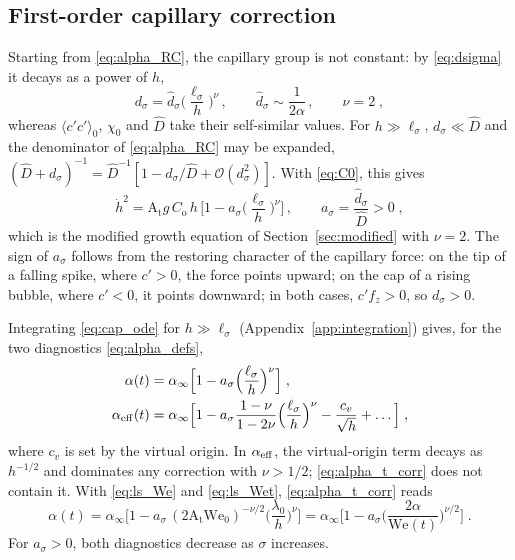 \documentclass[11pt]{article}
\numberwithin{equation}{section}
\newcommand{\avg}[1]{\langle #1\rangle}
\newcommand{\At}{\mathrm{A_t}}
\newcommand{\We}{\mathrm{We}_0}
\newcommand{\ls}{\ell_\sigma}
\newcommand{\hd}{\dot h}
\begin{document}
\subsection{First-order capillary correction}\label{sec:rc:ode}
Starting from \eqref{eq:alpha_RC}, the capillary group is not constant: by \eqref{eq:dsigma} it decays as a power of $h$,
\begin{equation}\label{eq:dsigma_power}
d_\sigma = \hat d_\sigma \Big(\frac{\ls}{h}\Big)^{\nu} \, , \qquad \hat d_\sigma \sim \frac{1}{2 \alpha} \, , \qquad \nu = 2 \;,
\end{equation}
whereas $\avg{c' c'}_0$, $\chi_0$ and $\hat D$ take their self-similar values. For $h \gg \ls$, $d_\sigma \ll \hat D$ and the denominator of \eqref{eq:alpha_RC} may be expanded, $(\hat D + d_\sigma)^{-1} = \hat D^{-1}[1 - d_\sigma/\hat D + \mathcal{O}(d_\sigma^2)]$. With \eqref{eq:C0}, this gives
\begin{equation}\label{eq:cap_ode}
\hd^2 = \At g \, C_\mathrm{o} \, h \, \Big[1 - a_\sigma \Big(\frac{\ls}{h}\Big)^{\nu}\Big] \, , \qquad a_\sigma = \frac{\hat d_\sigma}{\hat D} > 0 \;,
\end{equation}
which is the modified growth equation of Section~\ref{sec:modified} with $\nu = 2$. The sign of $a_\sigma$ follows from the restoring character of the capillary force: on the tip of a falling spike, where $c' > 0$, the force points upward; on the cap of a rising bubble, where $c' < 0$, it points downward; in both cases, $c' f_z > 0$, so $d_\sigma > 0$.

Integrating \eqref{eq:cap_ode} for $h \gg \ls$ (Appendix~\ref{app:integration}) gives, for the two diagnostics \eqref{eq:alpha_defs},
\begin{align}
\alpha(t) & = \alpha_\infty \Big[1 - a_\sigma \Big(\frac{\ls}{h}\Big)^{\nu}\Big] \;, \label{eq:alpha_t_corr} \\
\alpha_{\rm eff}(t) & = \alpha_\infty \Big[1 - a_\sigma \frac{1 - \nu}{1 - 2 \nu} \Big(\frac{\ls}{h}\Big)^{\nu}
- \frac{c_v}{\sqrt h} + \dots\Big] \;, \label{eq:alpha_eff_corr}
\end{align}
where $c_v$ is set by the virtual origin. In $\alpha_{\rm eff}$, the virtual-origin term decays as $h^{-1/2}$ and dominates any correction with $\nu > 1/2$; \eqref{eq:alpha_t_corr} does not contain it. With \eqref{eq:ls_We} and \eqref{eq:ls_Wet}, \eqref{eq:alpha_t_corr} reads
\begin{equation}\label{eq:alpha_We_corr}
\alpha(t) = \alpha_\infty \Big[1 - a_\sigma \,(2 \At \We)^{-\nu/2} \Big(\frac{\lambda_0}{h}\Big)^{\nu}\Big]
= \alpha_\infty \Big[1 - a_\sigma \Big(\frac{2 \alpha}{\mathrm{We}(t)}\Big)^{\nu/2}\Big] \;.
\end{equation}
For $a_\sigma > 0$, both diagnostics decrease as $\sigma$ increases.
\end{document}
